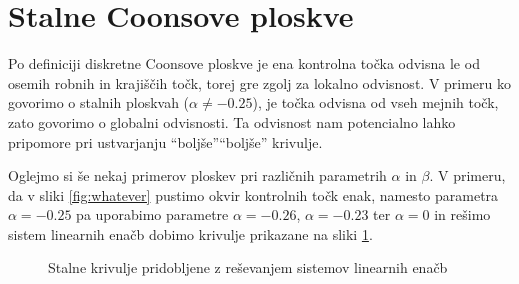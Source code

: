 \documentclass[a4paper,12pt]{article}
\begin{document}
\section{Stalne Coonsove ploskve}
\label{ch:4}

Po definiciji diskretne Coonsove ploskve je ena kontrolna točka odvisna le od osemih 
robnih in krajiščih točk, torej gre zgolj za lokalno odvisnost. V primeru ko govorimo o stalnih ploskvah 
($\alpha \neq  -0.25$), je točka odvisna od vseh mejnih točk, zato govorimo 
o globalni odvisnosti. Ta odvisnost nam potencialno lahko pripomore pri ustvarjanju 
``boljše''``boljše'' krivulje.

Oglejmo si še nekaj primerov ploskev pri različnih parametrih $\alpha$ in $\beta$.
V primeru, da v sliki \ref{fig:whatever} pustimo okvir kontrolnih točk enak,
namesto parametra $\alpha =- 0.25$ pa uporabimo 
parametre $\alpha = -0.26$, $\alpha = -0.23$ ter $\alpha = 0$ in rešimo sistem
linearnih enačb dobimo krivulje prikazane na sliki \ref{fig:coons_pospl}.

\begin{figure}[ht!]
   \centering
   \caption{Stalne krivulje pridobljene z reševanjem sistemov linearnih enačb}
\label{fig:coons_pospl}
\end{figure}
\end{document}
